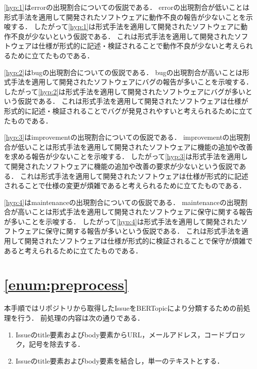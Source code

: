 \documentclass[main]{subfiles}
\begin{document}
\ref{hyp:1}はerrorの出現割合についての仮説である．
errorの出現割合が低いことは形式手法を適用して開発されたソフトウェアに動作不良の報告が少ないことを示唆する．
したがって\ref{hyp:1}は形式手法を適用して開発されたソフトウェアに動作不良が少ないという仮説である．
これは形式手法を適用して開発されたソフトウェアは仕様が形式的に記述・検証されることで動作不良が少ないと考えられるために立てたものである．

\ref{hyp:2}はbugの出現割合についての仮説である．
bugの出現割合が高いことは形式手法を適用して開発されたソフトウェアにバグの報告が多いことを示唆する．
したがって\ref{hyp:2}は形式手法を適用して開発されたソフトウェアにバグが多いという仮説である．
これは形式手法を適用して開発されたソフトウェアは仕様が形式的に記述・検証されることでバグが発見されやすいと考えられるために立てたものである．

\ref{hyp:3}はimprovementの出現割合についての仮説である．
improvementの出現割合が低いことは形式手法を適用して開発されたソフトウェアに機能の追加や改善を求める報告が少ないことを示唆する．
したがって\ref{hyp:3}は形式手法を適用して開発されたソフトウェアに機能の追加や改善の要求が少ないという仮説である．
これは形式手法を適用して開発されたソフトウェアは仕様が形式的に記述されることで仕様の変更が煩雑であると考えられるために立てたものである．

\ref{hyp:4}はmaintenanceの出現割合についての仮説である．
maintenanceの出現割合が高いことは形式手法を適用して開発されたソフトウェアに保守に関する報告が多いことを示唆する．
したがって\ref{hyp:4}は形式手法を適用して開発されたソフトウェアに保守に関する報告が多いという仮説である．
これは形式手法を適用して開発されたソフトウェアは仕様が形式的に検証されることで保守が煩雑であると考えられるために立てたものである．


\section{\ref{enum:preprocess}}
\label{sec:preprocess}

本手順ではリポジトリから取得したIssueをBERTopicにより分類するための前処理を行う．
前処理の内容は次の通りである．

\begin{enumerate}
	\item Issueのtitle要素およびbody要素からURL，メールアドレス，コードブロック，記号を除去する．
	\item Issueのtitle要素およびbody要素を結合し，単一のテキストとする．
\end{enumerate}
\end{document}
